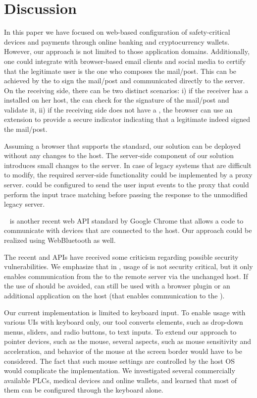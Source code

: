 \section{Discussion}
\label{sec:discussion_IK}

 In this paper we have focused on web-based configuration of safety-critical devices and payments through online banking and cryptocurrency wallets. However, our approach is not limited to those application domains. Additionally, one could integrate \name with browser-based email clients and social media to certify that the legitimate user is the one who composes the mail/post. This can be achieved by the \device to sign the mail/post and communicated directly to the server. On the receiving side, there can be two distinct scenarios: i) if the receiver has a \device installed on her host, the \device can check for the signature of the mail/post and validate it, ii) if the receiving side does not have a \device, the browser can use an extension to provide a secure indicator indicating that a legitimate \device indeed signed the mail/post.

 Assuming a browser that supports the \webusb standard, our solution can be deployed without any changes to the host. The server-side component of our solution introduces small changes to the server. In case of legacy systems that are difficult to modify, the required server-side functionality could be implemented by a proxy server. \device could be configured to send the user input events to the proxy that could perform the input trace matching before passing the response to the unmodified legacy server. 

 \webbt~\cite{webbt} is another recent web API standard by Google Chrome that allows a \js code to communicate with devices that are connected to the host. Our approach could be realized using WebBluetooth as well.

 The recent \webusb and \webbt APIs have received some criticism regarding possible security vulnerabilities. We emphasize that in \name, usage of \webusb is not security critical, but it only enables communication from the \device to the remote server via the unchanged host. If the use of \webusb should be avoided, \name can still be used with a browser plugin or an additional application on the host (that enables communication to the \device).

 Our current implementation is limited to keyboard input. To enable usage with various UIs with keyboard only, our tool converts elements, such as drop-down menus, sliders, and radio buttons, to text inputs. To extend our approach to pointer devices, such as the mouse, several aspects, such as mouse sensitivity and acceleration, and behavior of the mouse at the screen border would have to be considered. The fact that such mouse settings are controlled by the host OS would complicate the implementation. We investigated several commercially available PLCs, medical devices and online wallets, and learned that most of them can be configured through the keyboard alone.

